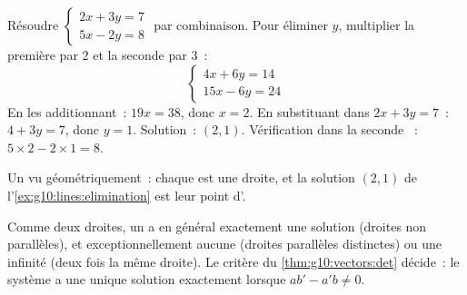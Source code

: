 \begin{example}\label{ex:g10:lines:elimination}
Résoudre $\begin{cases} 2x + 3y = 7 \\ 5x - 2y = 8 \end{cases}$ par
combinaison. Pour éliminer $y$, multiplier la première  par $2$
et la seconde par $3$~:
\[
\begin{cases}
4x + 6y = 14 \\
15x - 6y = 24
\end{cases}
\]
En les additionnant~: $19x = 38$, donc $x = 2$. En substituant dans
$2x + 3y = 7$~: $4 + 3y = 7$, donc $y = 1$. Solution~: $(2, 1)$.
Vérification dans la seconde ~: $5 \times 2 - 2 \times 1 = 8$.
\end{example}

\begin{omfigure}

{\small Un  vu géométriquement~: chaque  est une
droite, et la solution $(2,1)$ de l'\cref{ex:g10:lines:elimination} est
leur point d'.}
\end{omfigure}

\begin{remark}
Comme deux droites, un  a en général exactement une
solution (droites non parallèles), et exceptionnellement aucune (droites
parallèles distinctes) ou une infinité (deux fois la même droite). Le
critère du \cref{thm:g10:vectors:det} décide~: le système a une unique
solution exactement lorsque $ab' - a'b \neq 0$.
\end{remark}

